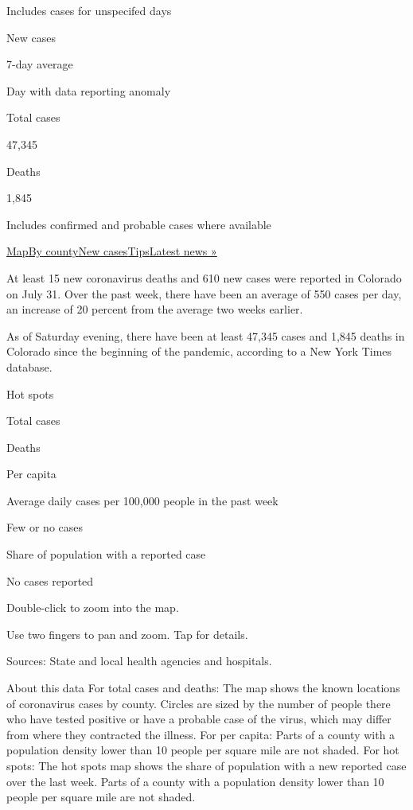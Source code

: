Includes cases for unspecifed days

New cases

7-day average

Day with data reporting anomaly

Total cases

47,345

Deaths

1,845

Includes confirmed and probable cases where available

\protect\hyperlink{map}{Map}\protect\hyperlink{county}{By
county}\protect\hyperlink{cases}{New
cases}\protect\hyperlink{tips}{Tips}\href{https://www.nytimes.com/2020/08/01/world/coronavirus-covid-19.html}{Latest
news »}

At least 15 new coronavirus deaths and 610 new cases were reported in
Colorado on July 31. Over the past week, there have been an average of
550 cases per day, an increase of 20 percent from the average two weeks
earlier.

As of Saturday evening, there have been at least 47,345 cases and 1,845
deaths in Colorado since the beginning of the pandemic, according to a
New York Times database.

Hot spots

Total cases

Deaths

Per capita

Average daily cases per 100,000 people in the past week

Few or no cases

Share of population with a reported case

No cases reported

Double-click to zoom into the map.

Use two fingers to pan and zoom. Tap for details.

Sources: State and local health agencies and hospitals.

About this data For total cases and deaths: The map shows the known
locations of coronavirus cases by county. Circles are sized by the
number of people there who have tested positive or have a probable case
of the virus, which may differ from where they contracted the illness.
For per capita: Parts of a county with a population density lower than
10 people per square mile are not shaded. For hot spots: The hot spots
map shows the share of population with a new reported case over the last
week. Parts of a county with a population density lower than 10 people
per square mile are not shaded.

